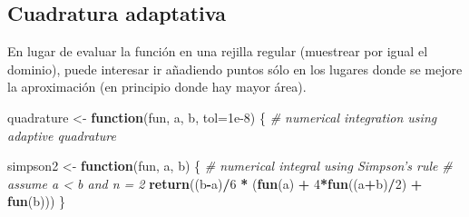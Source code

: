\documentclass[
]{book}
\newenvironment{Shaded}{\begin{snugshade}}{\end{snugshade}}
\newcommand{\CommentTok}[1]{\textcolor[rgb]{0.56,0.35,0.01}{\textit{#1}}}
\newcommand{\ControlFlowTok}[1]{\textcolor[rgb]{0.13,0.29,0.53}{\textbf{#1}}}
\newcommand{\DataTypeTok}[1]{\textcolor[rgb]{0.13,0.29,0.53}{#1}}
\newcommand{\DecValTok}[1]{\textcolor[rgb]{0.00,0.00,0.81}{#1}}
\newcommand{\FloatTok}[1]{\textcolor[rgb]{0.00,0.00,0.81}{#1}}
\newcommand{\KeywordTok}[1]{\textcolor[rgb]{0.13,0.29,0.53}{\textbf{#1}}}
\newcommand{\NormalTok}[1]{#1}
\newcommand{\OperatorTok}[1]{\textcolor[rgb]{0.81,0.36,0.00}{\textbf{#1}}}
\newcommand{\StringTok}[1]{\textcolor[rgb]{0.31,0.60,0.02}{#1}}
\theoremstyle{break}
\theoremstyle{definition}
\theoremstyle{definition}
\theoremstyle{definition}
\theoremstyle{remark}
\begin{document}
\hypertarget{cuadratura-adaptativa}{%
\subsection{Cuadratura adaptativa}\label{cuadratura-adaptativa}}

En lugar de evaluar la función en una rejilla regular (muestrear por igual el dominio),
puede interesar ir añadiendo puntos sólo en los lugares donde se mejore la aproximación
(en principio donde hay mayor área).

\begin{Shaded}
\begin{Highlighting}[]
\NormalTok{quadrature <-}\StringTok{ }\ControlFlowTok{function}\NormalTok{(fun, a, b, }\DataTypeTok{tol=}\FloatTok{1e-8}\NormalTok{) \{}
    \CommentTok{# numerical integration using adaptive quadrature}

\NormalTok{  simpson2 <-}\StringTok{ }\ControlFlowTok{function}\NormalTok{(fun, a, b) \{}
    \CommentTok{# numerical integral using Simpson's rule}
    \CommentTok{# assume a < b and n = 2}
    \KeywordTok{return}\NormalTok{((b}\OperatorTok{-}\NormalTok{a)}\OperatorTok{/}\DecValTok{6} \OperatorTok{*}\StringTok{ }\NormalTok{(}\KeywordTok{fun}\NormalTok{(a) }\OperatorTok{+}\StringTok{ }\DecValTok{4}\OperatorTok{*}\KeywordTok{fun}\NormalTok{((a}\OperatorTok{+}\NormalTok{b)}\OperatorTok{/}\DecValTok{2}\NormalTok{) }\OperatorTok{+}\StringTok{ }\KeywordTok{fun}\NormalTok{(b)))}
\NormalTok{  \}}
 

\end{Highlighting}
\end{Shaded}
\end{document}
